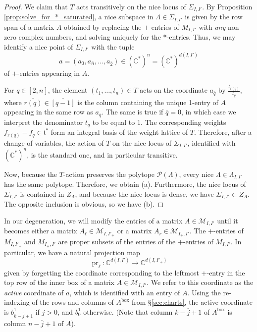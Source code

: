 \documentclass[12pt]{amsart}
\DeclareMathOperator{\inbox}{box}
\DeclareMathOperator{\pr}{pr}
\newcommand{\bC}{\mathbb{C}}
\newcommand{\cM}{\mathcal{M}}
\newcommand{\cP}{\mathcal{P}}
\newcommand{\barn}{\overline{n}}
\newcommand{\barq}{\overline{q}}
\begin{document}
\begin{proof}

    We claim that $T$ acts transitively on the nice locus of $\Sigma_{I,I'}$. By Proposition \ref{prop:solve_for_*_saturated}, a nice subspace in $\Lambda\in \Sigma_{I,I'}$ is given by the row span of a matrix $A$ obtained by replacing the $+$-entries of $M_{I,I'}$ with \emph{any} non-zero complex numbers, and solving uniquely for the $*$-entries. Thus, we may identify a nice point of $\Sigma_{I,I'}$ with the tuple
    \begin{equation*}
        a=(a_0,a_{\barn},\ldots,a_{\bar2})\in (\bC^{*})^n=(\bC^{*})^{d(I,I')}
    \end{equation*}
    of $+$-entries appearing in $A$.

    For $q\in[2,n]$, the element $(t_1,\ldots,t_n)\in T$ acts on the coordinate $a_{\barq}$ by $\frac{t_{r(q)}}{t_q}$, where $\overline{r(q)}\in\overline{[q-1]}$ is the column containing the unique 1-entry of $A$ appearing in the same row as $a_{\barq}$. The same is true if $\barq=0$, in which case we interpret the denominator $t_q$ to be equal to 1. The corresponding weights $f_{r(q)}-f_q\in \mathfrak{t}^{*}$ form an integral basis of the weight lattice of $T$. Therefore, after a change of variables, the action of $T$ on the nice locus of $\Sigma_{I,I'}$, identified with $(\bC^{*})^n$, is the standard one, and in particular transitive.

    Now, because the $T$-action preserves the polytope $\cP(\Lambda)$, every nice $\Lambda\in\Lambda_{I,I'}$ has the same polytope. Therefore, we obtain (a). Furthermore, the nice locus of $\Sigma_{I,I'}$ is contained in $Z_\Lambda$, and because the nice locus is dense, we have $\Sigma_{I,I'}\subset Z_\Lambda$. The opposite inclusion is obvious, so we have (b).
\end{proof}

In our degeneration, we will modify the entries of a matrix $A\in\cM_{I,I'}$ until it becomes either a matrix $A_\ell\in \cM_{I,I'_+}$ or a matrix $A_r\in\cM_{I_+,I'}$. The $+$-entries of $M_{I,I'_+}$ and $M_{I_+,I'}$ are proper subsets of the entries of the $+$-entries of $M_{I,I'}$. In particular, we have a natural projection map
\begin{equation*}
    \pr_\ell:\bC^{d(I,I')}\to \bC^{d(I,I'_+)}
\end{equation*}
given by forgetting the coordinate corresponding to the leftmost $+$-entry in the top row of the inner box of a matrix $A\in\cM_{I,I'}$. We refer to this coordinate as the \emph{active} coordinate of $a$, which is identified with an entry of $A$. Using the re-indexing of the rows and columns of $A^{\inbox}$ from \S\ref{sec:charts}, the active coordinate is $b^1_{\overline{k-j+1}}$ if $j>0$, and $b^1_0$ otherwise. (Note that column $\overline{k-j+1}$ of $A^{\inbox}$ is column $\overline{n-j+1}$ of $A$).
\end{document}
